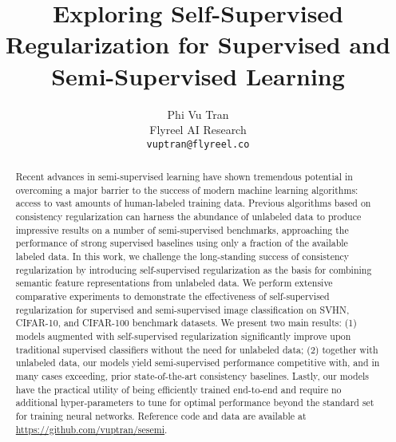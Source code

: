 \documentclass{article}
\title{Exploring Self-Supervised Regularization for Supervised and Semi-Supervised Learning}
\author{Phi Vu Tran \\
  Flyreel AI Research \\
  \texttt{vuptran@flyreel.co} \\
}
\begin{document}
\maketitle

\begin{abstract}
Recent advances in semi-supervised learning have shown tremendous potential in overcoming a major barrier to the success of modern machine learning algorithms: access to vast amounts of human-labeled training data. Previous algorithms based on consistency regularization can harness the abundance of unlabeled data to produce impressive results on a number of semi-supervised benchmarks, approaching the performance of strong supervised baselines using only a fraction of the available labeled data. In this work, we challenge the long-standing success of consistency regularization by introducing self-supervised regularization as the basis for combining semantic feature representations from unlabeled data. We perform extensive comparative experiments to demonstrate the effectiveness of self-supervised regularization for supervised and semi-supervised image classification on SVHN, CIFAR-10, and CIFAR-100 benchmark datasets. We present two main results: (1) models augmented with self-supervised regularization significantly improve upon traditional supervised classifiers without the need for unlabeled data; (2) together with unlabeled data, our models yield semi-supervised performance competitive with, and in many cases exceeding, prior state-of-the-art consistency baselines. Lastly, our models have the practical utility of being efficiently trained end-to-end and require no additional hyper-parameters to tune for optimal performance beyond the standard set for training neural networks. Reference code and data are available at \url{https://github.com/vuptran/sesemi}.
\end{abstract}
\end{document}
